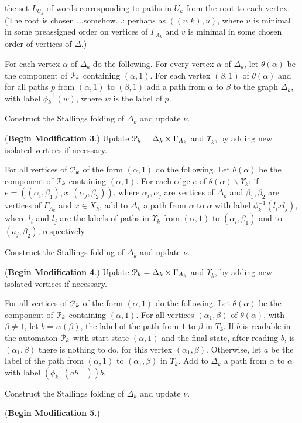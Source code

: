 \documentclass[a4paper,12pt]{article}
\renewcommand{\a}{\alpha }
\renewcommand{\b}{\beta }
\newcommand{\G}{\Gamma }
\newcommand{\D}{\Delta }
\newcommand{\U}{\Upsilon }
\newcommand{\cP}{{\cal{P}}}
\numberwithin{equation}{section}
\numberwithin{figure}{section}
\newcommand{\bs}{\backslash}
\begin{document}
the set $L_{U_k}$ of words corresponding to paths in $U_k$ from the root
to each vertex. (The root is chosen ...somehow...: 
perhaps as $((v,k), u)$, where 
$u$ is minimal in some preassigned order on vertices of $\G_{A_k}$ and
$v$ is minimal in some chosen order of vertices of $\D$.)
\item For each vertex $\a$ of $\D_k$ do the following.
For every vertex $\a$ of $\D_k$, let 
$\theta(\a)$ be the component of $\cP_k$ containing $(\a,1)$.  
For each vertex $(\b,1)$ of $\theta(\a)$ and for all paths $p$ from 
$(\a,1)$ to $(\b,1)$ add a path from $\a$ to $\b$ to the graph $\D_k$, with
label $\phi_k^{-1}(w)$, where $w$ is the label of $p$. 
\item Construct the Stallings folding of $\D_k$ and update $\nu$.
\item (\textbf{Begin Modification 3}.)
 Update $\cP_k=\D_k\times \G_{A_k}$ and $\U_k$, by adding new isolated vertices
if necessary. 
\item For all vertices of $\cP_k$ of the form $(\a,1)$ do the following.
Let $\theta(\a)$ be the component of $\cP_k$ containing $(\a,1)$. 
For each edge $e$ of $\theta(\a)\bs \U_k$: if $e=((\a_i,\b_1),x ,(\a_j,\b_2))$, where $\a_i,\a_j$ are vertices of $\D_k$ and $\b_1,\b_2$ are vertices
of $\G_{A_k}$ and $x\in X_k$, add to $\D_k$ a path from $\a$ to $\a$ with
label $\phi_k^{-1}(l_ixl_j)$, where $l_i$ and $l_j$ are the labels of 
paths in $\U_k$ from $(\a,1)$ to $(\a_i,\b_1)$ and to $(a_j,\b_2)$, 
respectively.
\item Construct the Stallings folding of $\D_k$ and update $\nu$.
\item (\textbf{Begin Modification 4}.)
 Update $\cP_k=\D_k\times \G_{A_k}$ and $\U_k$, by adding new isolated vertices
if necessary. 
\item For all vertices of $\cP_k$ of the form $(\a,1)$ do the following.
Let $\theta(\a)$ be the component of $\cP_k$ containing $(\a,1)$. 
For all vertices $(\a_1,\b)$ of $\theta(\a)$, with $\b\neq 1$, let 
$b=w(\b)$, the label of the path from $1$ to $\b$ in $T_k$. If 
$b$ is readable in the automaton $\cP_k$ with start state $(\a,1)$ and 
the final state, after reading $b$, is $(\a_1,\b)$ there is nothing to do,
for this vertex $(\a_1,\b)$. Otherwise, let $a$ be the label of the
path from $(\a,1)$ to $(\a_1,\b)$ in $\U_k$. Add to $\D_k$ a path from
$\a$ to $\a_1$ with label $(\phi_k^{-1}(ab^{-1}))b$. 
\item Construct the Stallings folding of $\D_k$ and update $\nu$.
\item (\textbf{Begin Modification 5}.)
\end{document}
